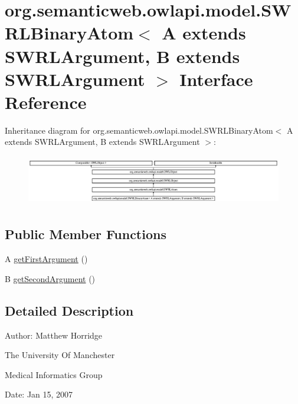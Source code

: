 \hypertarget{interfaceorg_1_1semanticweb_1_1owlapi_1_1model_1_1_s_w_r_l_binary_atom_3_01_a_01extends_01_s_w_rc30c5b4d74ec2b23e92d0d06ccd24e5f}{\section{org.\-semanticweb.\-owlapi.\-model.\-S\-W\-R\-L\-Binary\-Atom$<$ A extends S\-W\-R\-L\-Argument, B extends S\-W\-R\-L\-Argument $>$ Interface Reference}
\label{interfaceorg_1_1semanticweb_1_1owlapi_1_1model_1_1_s_w_r_l_binary_atom_3_01_a_01extends_01_s_w_rc30c5b4d74ec2b23e92d0d06ccd24e5f}
}
Inheritance diagram for org.\-semanticweb.\-owlapi.\-model.\-S\-W\-R\-L\-Binary\-Atom$<$ A extends S\-W\-R\-L\-Argument, B extends S\-W\-R\-L\-Argument $>$\-:\begin{figure}[H]
\begin{center}
\leavevmode
\includegraphics[height=2.232855cm]{interfaceorg_1_1semanticweb_1_1owlapi_1_1model_1_1_s_w_r_l_binary_atom_3_01_a_01extends_01_s_w_rc30c5b4d74ec2b23e92d0d06ccd24e5f}
\end{center}
\end{figure}
\subsection*{Public Member Functions}
\begin{DoxyCompactItemize}
\item 
A \hyperlink{interfaceorg_1_1semanticweb_1_1owlapi_1_1model_1_1_s_w_r_l_binary_atom_3_01_a_01extends_01_s_w_rc30c5b4d74ec2b23e92d0d06ccd24e5f_a17aa4ba06a13952a46c4bfdc72dc3caf}{get\-First\-Argument} ()
\item 
B \hyperlink{interfaceorg_1_1semanticweb_1_1owlapi_1_1model_1_1_s_w_r_l_binary_atom_3_01_a_01extends_01_s_w_rc30c5b4d74ec2b23e92d0d06ccd24e5f_a352a713b2cd78c6cb4fbf82f92e88bc4}{get\-Second\-Argument} ()
\end{DoxyCompactItemize}


\subsection{Detailed Description}
Author\-: Matthew Horridge\par
 The University Of Manchester\par
 Medical Informatics Group\par
 Date\-: Jan 15, 2007\par
\par
 

